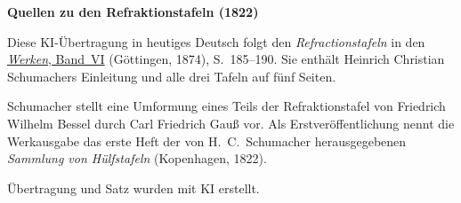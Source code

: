 \clearpage\thispagestyle{empty}
\begin{center}\textbf{Quellen zu den Refraktionstafeln (1822)}\end{center}
\noindent Diese KI-Übertragung in heutiges Deutsch folgt den \textit{Refractionstafeln} in den \href{https://gdz.sub.uni-goettingen.de/id/PPN236007467}{\textit{Werken}, Band~VI} (Göttingen, 1874), S.~185--190. Sie enthält Heinrich Christian Schumachers Einleitung und alle drei Tafeln auf fünf Seiten.
\par\smallskip\noindent Schumacher stellt eine Umformung eines Teils der Refraktionstafel von Friedrich Wilhelm Bessel durch Carl Friedrich Gauß vor. Als Erstveröffentlichung nennt die Werkausgabe das erste Heft der von H.~C.~Schumacher herausgegebenen \textit{Sammlung von Hülfstafeln} (Kopenhagen, 1822).
\par\smallskip\noindent Übertragung und Satz wurden mit KI erstellt.
\clearpage
